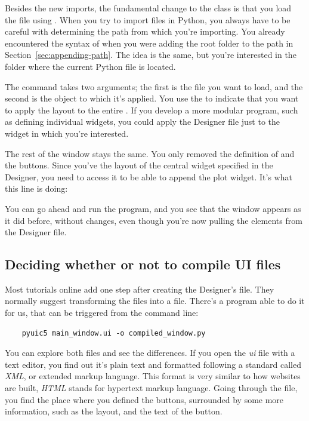 Besides the new imports, the fundamental change to the  class is that you load the file using . When you try to import files in Python, you always have to be careful with determining the path from which you're importing. You already encountered the syntax of  when you were adding the root folder to the path in Section~\ref{sec:appending-path}. The idea is the same, but you're interested in the folder where the current Python file is located.

The command  takes two arguments; the first is the file you want to load, and the second is the object to which it's applied. You use the  to indicate that you want to apply the layout to the entire . If you develop a more modular program, such as defining individual widgets, you could apply the Designer file just to the widget in which you're interested.

The rest of the window stays the same. You only removed the definition of  and the buttons. Since you've the layout of the central widget specified in the Designer, you need to access it to be able to append the plot widget. It's what this line is doing:


You can go ahead and run the program, and you see that the window appears as it did before, without changes, even though you're now pulling the elements from the Designer file.

\subsection{Deciding whether or not to compile UI files}\label{subsec:compiling-or-not-compiling-ui-files}
Most tutorials online add one step after creating the Designer's file. They normally suggest transforming the  files into a  file. There's a program able to do it for us, that can be triggered from the command line:

\begin{verbatim}
    pyuic5 main_window.ui -o compiled_window.py
\end{verbatim}

You can explore both files and see the differences. If you open the \emph{ui} file with a text editor, you find out it's plain text and formatted following a standard called \emph{XML}, or extended markup language. This format is very similar to how websites are built, \emph{HTML} stands for hypertext markup language. Going through the file, you find the place where you defined the buttons, surrounded by some more information, such as the layout, and the text of the button.

